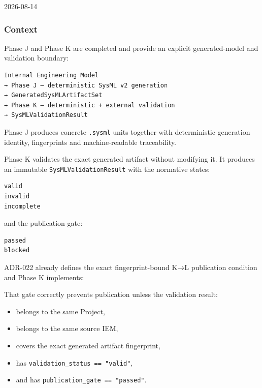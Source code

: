 2026-08-14

\hypertarget{context-8}{%
\subsubsection{Context}\label{context-8}}

Phase J and Phase K are completed and provide an explicit generated-model and validation boundary:

\begin{verbatim}
Internal Engineering Model
→ Phase J — deterministic SysML v2 generation
→ GeneratedSysMLArtifactSet
→ Phase K — deterministic + external validation
→ SysMLValidationResult
\end{verbatim}

Phase J produces concrete \texttt{.sysml} units together with deterministic generation identity, fingerprints and machine-readable traceability.

Phase K validates the exact generated artifact without modifying it. It produces an immutable \texttt{SysMLValidationResult} with the normative states:

\begin{verbatim}
valid
invalid
incomplete
\end{verbatim}

and the publication gate:

\begin{verbatim}
passed
blocked
\end{verbatim}

ADR-022 already defines the exact fingerprint-bound K→L publication condition and Phase K implements:

\begin{Shaded}
\begin{Highlighting}[]
\NormalTok{) }\OperatorTok{{-}\textgreater{}} 
\end{Highlighting}
\end{Shaded}

That gate correctly prevents publication unless the validation result:

\begin{itemize}
\tightlist
\item
  belongs to the same Project,
\item
  belongs to the same source IEM,
\item
  covers the exact generated artifact fingerprint,
\item
  has \texttt{validation\_status\ ==\ "valid"},
\item
  and has \texttt{publication\_gate\ ==\ "passed"}.
\end{itemize}

